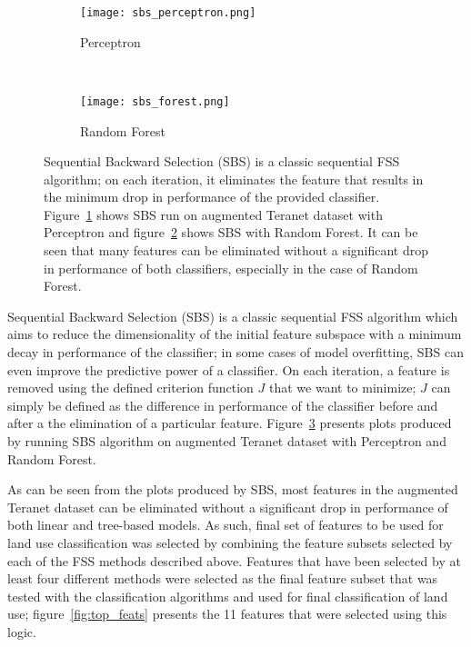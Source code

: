 \begin{figure}[hbt!]
    \centering
    \begin{subfigure}[t]{.45\textwidth}
        \centering
        \texttt{[image: sbs\_perceptron.png]}
        \caption{Perceptron}
        \label{fig:sbs_perceptron}
    \end{subfigure}
    ~ %
    \begin{subfigure}[t]{.53\textwidth}
        \centering
        \texttt{[image: sbs\_forest.png]}
        \caption{Random Forest}
        \label{fig:sbs_forest}
    \end{subfigure}
    \caption{Sequential Backward Selection (SBS) is a classic sequential FSS algorithm;
    on each iteration, it eliminates the feature that results in the minimum drop in performance of the provided classifier.
    Figure~\ref{fig:sbs_perceptron} shows SBS run on augmented Teranet dataset with Perceptron and figure~\ref{fig:sbs_forest} shows SBS with Random Forest.
    It can be seen that many features can be eliminated without a significant drop in performance of both classifiers, especially in the case of Random Forest.}
    \label{fig:sbs_teranet}
\end{figure}

Sequential Backward Selection (SBS) is a classic sequential FSS algorithm which aims to reduce the dimensionality of the initial feature subspace with a minimum decay in performance of the classifier;
in some cases of model overfitting, SBS can even improve the predictive power of a classifier.
On each iteration, a feature is removed using the defined criterion function $J$ that we want to minimize;
$J$ can simply be defined as the difference in performance of the classifier before and after a the elimination of a particular feature.
Figure~\ref{fig:sbs_teranet} presents plots produced by running SBS algorithm on augmented Teranet dataset with Perceptron and Random Forest.

As can be seen from the plots produced by SBS, most features in the augmented Teranet dataset can be eliminated without a significant drop in performance of both linear and tree-based models.
As such, final set of features to be used for land use classification was selected by combining the feature subsets selected by each of the FSS methods described above.
Features that have been selected by at least four different methods were selected as the final feature subset that was tested with the classification algorithms and used for final classification of land use;
figure~\ref{fig:top_feats} presents the 11 features that were selected using this logic.

